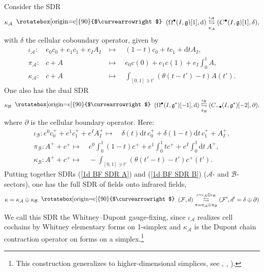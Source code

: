 \documentclass{amsart}
\theoremstyle{plain} %
\theoremstyle{definition}
\theoremstyle{remark}
\newcommand{\g}{\mathfrak{g}}
\newcommand{\bt}{\bullet}
\newcommand{\F}{\mathcal{F}}
\newcommand{\dd}{\partial}
\newcommand{\SDR}[5]{#5\;\;\raisebox{1.3pt}{\rotatebox[origin=c]{90}{$\curvearrowright$}}\;\; #1 \underset{#4}{\stackrel{#3}{\leftrightarrows}} #2}  %
\newcommand{\A}{\mathcal{A}}
\newcommand{\B}{\mathcal{B}}
\newcommand{\dr}{\mathrm{d}}
\begin{document}
Consider the SDR
\begin{equation}\label{1d BF SDR A}
    \SDR{(\Omega^\bt(I,\g)[1],\dr)}{(C^\bt(I,\g)[1],\delta)}{\iota_\A}{\pi_\A}{\kappa_\A},
\end{equation}
with $\delta$ the cellular coboundary operator,
given by
\begin{eqnarray}
    \iota_\A\colon & e_0 c_0 + e_1 c_1 + e_I A_I & \mapsto \quad
    (1-t) c_0 + t c_1 + \dr t A_I,\\
    \pi_\A \colon & c+A &\mapsto\quad  e_0 c(0) + e_1 c(1) + e_I \int_0^1 A,\\
    \kappa_\A \colon & c+A &\mapsto\quad 
    \int_{[0,1]\ni t'} (\theta(t-t')-t) A(t').
\end{eqnarray}
One also has the dual SDR
\begin{equation}\label{1d BF SDR B}
    \SDR{(\Omega^\bt(I,\g^*)[-1],\dr)}{(C_{-\bt}(I,\g^*)[-2],\dd)}{\iota_\B}{\pi_\B}{\kappa_\B},
\end{equation}
where $\dd$ is the cellular boundary operator. Here:
\begin{gather}
    \iota_\B\colon  e^0 c^+_0 + e^1 c^+_1 + e^I A^+_I \mapsto \quad
    \delta(t)\dr t\, c_0^+ + \delta(1-t)\dr t\, c_1^+ + A_I^+,\\
    \pi_\B\colon  A^++c^+ \mapsto\quad 
    e^0 \int_0^1 (1-t) c^+ +e^1 \int_0^1 t c^+ + e^I \int_0^1 \dr t\, A^+,\\
    \kappa_\B\colon  A^++c^+ \mapsto \quad
    -\int_{[0,1]\ni t'} (\theta(t'-t)-t')c^+(t').
\end{gather}
Putting together SDRs (\ref{1d BF SDR A}) and (\ref{1d BF SDR B}) ($\A$- and $\B$-sectors), one has the full SDR of fields onto infrared fields,
\begin{equation}\label{1d BF interval SDR}
    \SDR{(\F,d)}{(\F',d'=\delta\oplus\dd)}{\iota=\iota_\A\oplus \iota_\B}{\pi=\pi_\A\oplus \pi_\B}{\kappa=\kappa_\A\oplus \kappa_\B}
\end{equation}
We call this SDR the Whitney--Dupont gauge-fixing, since $\iota_\A$ realizes cell cochains by Whitney elementary forms on 1-simplex and $\kappa_\A$ is the Dupont chain contraction operator on forms on a simplex.\footnote{This construction generalizes to higher-dimensional simplices, see \cite{Getzler_Lie}, \cite{simpBF}, \cite{discrBF}).}
\end{document}
